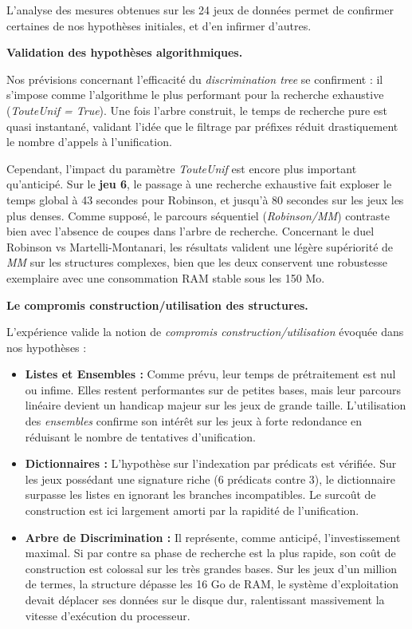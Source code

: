 \documentclass[11pt]{article}
\newenvironment{paraph}[1]{%
  \medskip
  \noindent\textbf{#1.}\quad

  \vspace{0.2cm}
}{%
  \medskip
}
\begin{document}
L'analyse des mesures obtenues sur les 24 jeux de données permet de confirmer certaines de nos hypothèses initiales, et d'en infirmer d'autres.

\begin{paraph}{Validation des hypothèses algorithmiques}
    Nos prévisions concernant l'efficacité du \textit{discrimination tree} se confirment : il s'impose comme l'algorithme le plus performant pour la recherche exhaustive (\textit{TouteUnif = True}). Une fois l'arbre construit, le temps de recherche pure est quasi instantané, validant l'idée que le filtrage par préfixes réduit drastiquement le nombre d'appels à l'unification. 

    Cependant, l'impact du paramètre \textit{TouteUnif} est encore plus important qu'anticipé. Sur le \textbf{jeu 6}, le passage à une recherche exhaustive fait exploser le temps global à 43 secondes pour Robinson, et jusqu'à 80 secondes sur les jeux les plus denses. Comme supposé, le parcours séquentiel (\textit{Robinson/MM}) contraste bien avec l'absence de coupes dans l'arbre de recherche. Concernant le duel Robinson vs Martelli-Montanari, les résultats valident une légère supériorité de \textit{MM} sur les structures complexes, bien que les deux conservent une robustesse exemplaire avec une consommation RAM stable sous les 150 Mo.
\end{paraph}

\begin{paraph}{Le compromis construction/utilisation des structures}
    L'expérience valide la notion de \textit{compromis construction/utilisation} évoquée dans nos hypothèses :
    \begin{itemize}
        \item \textbf{Listes et Ensembles :} Comme prévu, leur temps de prétraitement est nul ou infime. Elles restent performantes sur de petites bases, mais leur parcours linéaire devient un handicap majeur sur les jeux de grande taille. L'utilisation des \textit{ensembles} confirme son intérêt sur les jeux à forte redondance en réduisant le nombre de tentatives d'unification.
        \item \textbf{Dictionnaires :} L'hypothèse sur l'indexation par prédicats est vérifiée. Sur les jeux possédant une signature riche (6 prédicats contre 3), le dictionnaire surpasse les listes en ignorant les branches incompatibles. Le surcoût de construction est ici largement amorti par la rapidité de l'unification.
        \item \textbf{Arbre de Discrimination :} Il représente, comme anticipé, l'investissement maximal. Si par contre sa phase de recherche est la plus rapide, son coût de construction est colossal sur les très grandes bases. Sur les jeux d'un million de termes, la structure dépasse les 16 Go de RAM, le système d'exploitation devait déplacer ses données sur le disque dur, ralentissant massivement la vitesse d'exécution du processeur.
    \end{itemize}
\end{paraph}
\end{document}
